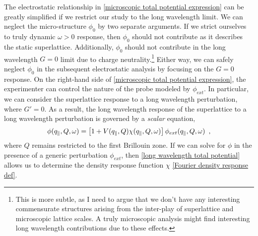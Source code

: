 The electrostatic relationship in \eqref{microscopic total potential expression} can be greatly simplified if we restrict our study to the long wavelength limit.  We can neglect the micro-structure $\phi_0$ by two separate arguments.  If we strict ourselves to truly dynamic $\omega>0$ response, then $\phi_0$ should not contribute as it describes the static superlattice.  Additionally, $\phi_0$ should not contribute in the long wavelength $G=0$ limit due to charge neutrality.\footnote{This is more subtle, as I need to argue that we don't have any interesting commensurate structures arising from the inter-play of superlattice and microscopic lattice scales.  A truly microscopic analysis might find interesting long wavelength contributions due to these effects.}  Either way, we can safely neglect $\phi_0$ in the subsequent electrostatic analysis by focusing on the $G=0$ response.  On the right-hand side of \eqref{microscopic total potential expression}, the experimenter can control the nature of the probe modeled by $\phi_{ext}$.  In particular, we can consider the superlattice response to a long wavelength perturbation, where $G'=0$.  As a result, the long wavelength response of the superlattice to a long wavelength perturbation is governed by a {\it scalar} equation,
\begin{equation}
    \label{long wavelength total potential}
    \phi(q_\parallel, Q, \omega) 
    =
    \left[
    1
    +
    V(q_\parallel, Q)
    \chi(q_\parallel, Q, \omega)
    \right]
    \phi_{ext}(q_\parallel, Q, \omega)
    \,\,\,,
\end{equation}
where $Q$ remains restricted to the first Brillouin zone.  If we can solve for $\phi$ in the presence of a generic perturbation $\phi_{ext}$, then \eqref{long wavelength total potential} allows us to determine the density response function $\chi$ \eqref{Fourier density response def}.